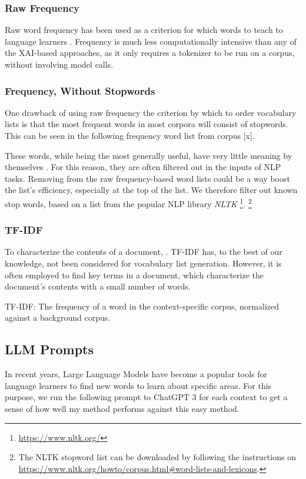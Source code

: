 \subsubsection{Raw Frequency}

Raw word frequency has been used as a criterion for which words to teach to language learners \cite{heChoosingWordsTeach2019}.
Frequency is much less computationally intensive than any of the XAI-based approaches, as it only requires a tokenizer to be run on a corpus, without involving model calls.

\subsubsection{Frequency, Without Stopwords}
One drawback of using raw frequency the criterion by which to order vocabulary lists is that the most frequent words in most corpora will consist of stopwords.
This can be seen in the following frequency word list from corpus [x].

These words, while being the most generally useful, have very little meaning by themselves \cite{rajaraman2011data}.
For this reason, they are often filtered out in the inputs of NLP tasks.
Removing from the raw frequency-based word lists could be a way boost the list's  efficiency, especially at the top of the list.
We therefore filter out known stop words, based on a list from the popular NLP library \textit{NLTK} \footnote{\url{https://www.nltk.org/}}.
\footnote{The NLTK stopword list can be downloaded by following the instructions on \url{https://www.nltk.org/howto/corpus.html\#word-lists-and-lexicons}.}


\subsubsection{TF-IDF}
To characterize the contents of a document, \cite{qaiserTextMiningUse2018}.
TF-IDF has, to the best of our knowledge, not been considered for vocabulary list generation.
However, it is often employed to find key terms in a document, which characterize the document's contents with a small number of words.

TF-IDF: The frequency of a word in the context-specific corpus, normalized against a background corpus.

\subsection{LLM Prompts}
In recent years, Large Language Models have become a popular tools for language learners to find new words to learn about specific areas.
For this purpose, we run the following prompt to ChatGPT 3 for each context to get a sense of how well my method performs against this easy method.

